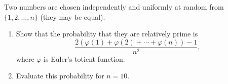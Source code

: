 Two numbers are chosen independently and uniformly at random from $\{1,2,\dots,n\}$ (they may be equal).
\begin{enumerate}
\item[(a)] Show that the probability that they are relatively prime is
\[\dfrac{2\left(\varphi(1)+\varphi(2)+\cdots+\varphi(n)\right)-1}{n^2},\]
where $\varphi$ is Euler's totient function.
\item[(b)] Evaluate this probability for $n=10$.
\end{enumerate}
